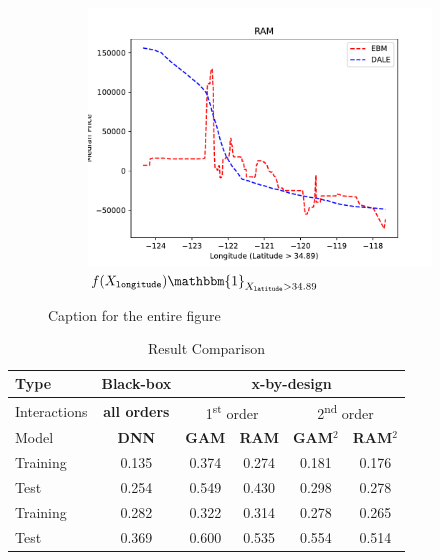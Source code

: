 \documentclass[12pt]{article}
\newcommand{\when}[1]{\mathbbm{1}_{#1}}
\begin{document}
\begin{figure}[htbp]
    \begin{subfigure}{0.32\textwidth}
        \centering
        \includegraphics[width=\textwidth]{figures/california_ram_2}
        \caption{\(f(X_{\mathtt{longitude}}) \when{X_{\mathtt{latitude}} > 34.89}\)}
        \label{subfig:california_ram_2}
    \end{subfigure}
    \caption{Caption for the entire figure}
    \label{fig:california_housing}
\end{figure}


\begin{table}[htbp]
  \centering
  \caption{Result Comparison}
  \label{tab:sample}
  \begin{tabular}{l|c|cccc}
      \hline
      Type & \textbf{Black-box} & \multicolumn{4}{c}{\textbf{x-by-design}} \\
      \hline
      \hline
      Interactions & \textbf{all orders} & \multicolumn{2}{c}{1\textsuperscript{st} order} & \multicolumn{2}{c}{2\textsuperscript{nd} order} \\
      \hline
      \hline
      Model & \textbf{DNN} & \textbf{GAM} & \textbf{RAM} & \textbf{GAM}$^2$ & \textbf{RAM}$^2$ \\
      \hline
      Training & 0.135 & 0.374 & 0.274 & 0.181 & 0.176 \\
      Test     & 0.254 & 0.549 & 0.430 & 0.298 & 0.278 \\
      \hline
      Training & 0.282 & 0.322 & 0.314 & 0.278 & 0.265 \\
      Test     & 0.369 & 0.600 & 0.535 & 0.554 & 0.514 \\
  \end{tabular}
\end{table}
\end{document}
